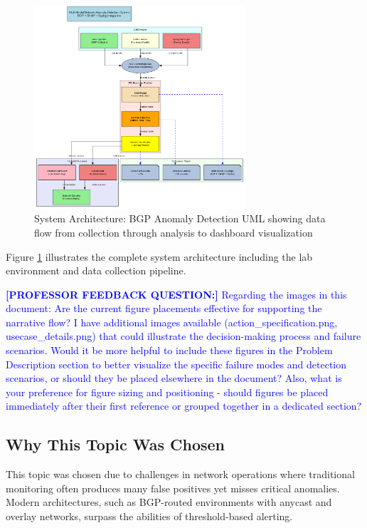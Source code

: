 \documentclass[11pt]{article}
\begin{document}
\begin{figure}[h]
\centering
\includegraphics[width=0.7\textwidth]{system_architecture.png}
\caption{System Architecture: BGP Anomaly Detection UML showing data flow from collection through analysis to dashboard visualization}
\label{fig:architecture}
\end{figure}

Figure \ref{fig:architecture} illustrates the complete system architecture including the lab environment and data collection pipeline.

\textcolor{blue}{\textbf{[PROFESSOR FEEDBACK QUESTION:]} Regarding the images in this document: Are the current figure placements effective for supporting the narrative flow? I have additional images available (action\_specification.png, usecase\_details.png) that could illustrate the decision-making process and failure scenarios. Would it be more helpful to include these figures in the Problem Description section to better visualize the specific failure modes and detection scenarios, or should they be placed elsewhere in the document? Also, what is your preference for figure sizing and positioning - should figures be placed immediately after their first reference or grouped together in a dedicated section?}

\subsection{Why This Topic Was Chosen}

This topic was chosen due to challenges in network operations where traditional monitoring often produces many false positives yet misses critical anomalies. Modern architectures, such as BGP-routed environments with anycast and overlay networks, surpass the abilities of threshold-based alerting.
\end{document}
